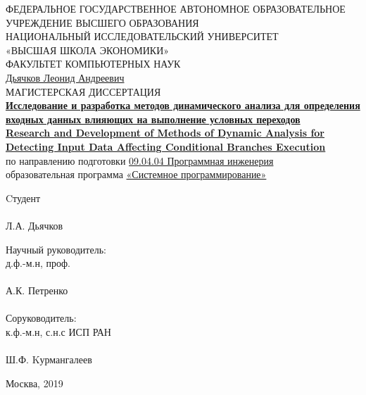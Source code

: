 \begin{titlepage}
	\begin{center}
	\textsc{\normalsize{ФЕДЕРАЛЬНОЕ ГОСУДАРСТВЕННОЕ АВТОНОМНОЕ ОБРАЗОВАТЕЛЬНОЕ}}\\
\textsc{\normalsize{УЧРЕЖДЕНИЕ ВЫСШЕГО ОБРАЗОВАНИЯ}}\\
\textsc{\normalsize{НАЦИОНАЛЬНЫЙ ИССЛЕДОВАТЕЛЬСКИЙ УНИВЕРСИТЕТ}}\\
\textsc{\normalsize{{«ВЫСШАЯ ШКОЛА ЭКОНОМИКИ»}}\\
	\normalsize{ФАКУЛЬТЕТ КОМПЬЮТЕРНЫХ НАУК}}
	\\[.5cm]
	\normalsize{\underline{Дьячков Леонид Андреевич}}\\[.5cm]

	\normalsize{МАГИСТЕРСКАЯ ДИССЕРТАЦИЯ}\\[.8cm]

	{\normalsize {\ul{\textbf{Исследование и разработка методов динамического анализа для определения входных данных влияющих на выполнение условных переходов}}}} \\[.3cm]
	{\normalsize {\ul{\textbf{Research and Development of Methods of Dynamic Analysis for Detecting Input Data Affecting Conditional Branches Execution}}}}\\[.5cm]

	по направлению подготовки \underline{09.04.04 Программная инженерия}\\
	образовательная программа \underline{«Системное программирование»}

	\begin{flushleft}
	Cтудент\\
	\underline{\hspace{3cm}}\\
	Л.А. Дьячков\\
	\end{flushleft}
	\begin{flushright}
		
		Научный руководитель: \\ 
		д.ф.-м.н, проф. \\
		\underline{\hspace{3cm}}\\
		А.К. Петренко \\
		\\[.2cm]
		Соруководитель: \\ 
		к.ф.-м.н, с.н.с ИСП РАН \\
		\underline{\hspace{3cm}}\\
		Ш.Ф. Kурмангалеев \\
	\end{flushright}
	\vfill
	
	Москва, 2019
	\end{center}

\end{titlepage}
